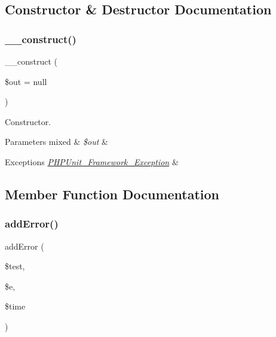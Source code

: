 \subsection{Constructor \& Destructor Documentation}
\mbox{\label{class_p_h_p_unit___util___log___t_a_p_a058d0261b18ee18c9fad1ffb1d08775c}} 
\subsubsection{\texorpdfstring{\+\_\+\+\_\+construct()}{\_\_construct()}}
{\footnotesize\ttfamily \+\_\+\+\_\+construct (\begin{DoxyParamCaption}\item[{}]{\$out = {\ttfamily null} }\end{DoxyParamCaption})}

Constructor.


\begin{DoxyParams}[1]{Parameters}
mixed & {\em \$out} & \\
\hline
\end{DoxyParams}

\begin{DoxyExceptions}{Exceptions}
{\em \mbox{\hyperlink{class_p_h_p_unit___framework___exception}{P\+H\+P\+Unit\+\_\+\+Framework\+\_\+\+Exception}}} & \\
\hline
\end{DoxyExceptions}


\subsection{Member Function Documentation}
\mbox{\label{class_p_h_p_unit___util___log___t_a_p_a320d7bc7d2f9264ee7ba7aca6fd2df41}} 
\subsubsection{\texorpdfstring{add\+Error()}{addError()}}
{\footnotesize\ttfamily add\+Error (\begin{DoxyParamCaption}\item[{\mbox{\hyperlink{interface_p_h_p_unit___framework___test}{P\+H\+P\+Unit\+\_\+\+Framework\+\_\+\+Test}}}]{\$test,  }\item[{Exception}]{\$e,  }\item[{}]{\$time }\end{DoxyParamCaption})}

